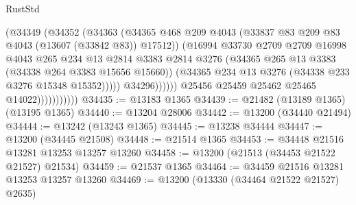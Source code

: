 \begin{lexlean}{RustStd}
\begin{coremodule}
                                    (@34349
                                      (@34352
                                        (@34363
                                          (@34365
                                            @468
                                            @209
                                            @4043
                                            (@33837
                                              @83
                                              @209
                                              @83
                                              @4043
                                              (@13607 (@33842 @83))
                                              @17512))
                                          (@16994
                                            @33730
                                            @2709
                                            @2709
                                            @16998
                                            @4043
                                            @265
                                            @234
                                            @13
                                            @2814
                                            @3383
                                            @2814
                                            @3276
                                            (@34365
                                              @265
                                              @13
                                              @3383
                                              (@34338 @264 @3383 @15656 @15660))
                                            (@34365
                                              @234
                                              @13
                                              @3276
                                              (@34338 @233 @3276 @15348 @15352)))))
                                      @34296))))))
                          @25456
                          @25459
                          @25462
                          @25465
                          @14022)))))))))))
@34435 := @13183 @1365
@34439 := @21482 (@13189 @1365) (@13195 @1365)
@34440 := @13204 @28006
@34442 := @13200 (@34440 @21494)
@34444 := @13242 (@13243 @1365)
@34445 := @13238 @34444
@34447 := @13200 (@34445 @21508)
@34448 := @21514 @1365
@34453 := @34448 @21516 @13281 @13253 @13257 @13260
@34458 := @13200 (@21513 (@34453 @21522 @21527) @21534)
@34459 := @21537 @1365
@34464 := @34459 @21516 @13281 @13253 @13257 @13260
@34469 := @13200 (@13330 (@34464 @21522 @21527) @2635)

\end{coremodule}
\end{lexlean}
